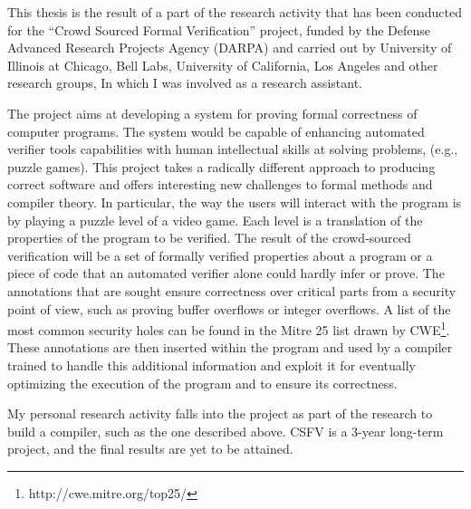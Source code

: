 
This thesis is the result of a part of the research activity that has been conducted for the ``Crowd Sourced Formal Verification'' project, funded by the Defense Advanced Research Projects Agency (DARPA) and carried out by University of Illinois at Chicago, Bell Labs, University of California, Los Angeles and other research groups, In which I was involved as a research assistant.

The project aims at developing a system for proving formal correctness of computer programs. The system would be capable of enhancing automated verifier tools capabilities with human intellectual skills at solving problems, (e.g., puzzle games). This project takes a radically different approach to producing correct software and offers interesting new challenges to formal methods and compiler theory. In particular, the way the users will interact with the program is by playing a puzzle level of a video game. Each level is a translation of the properties of the program to be verified. The result of the crowd-sourced verification will be a set of formally verified properties about a program or a piece of code that an automated verifier alone could hardly infer or prove. The annotations that are sought ensure correctness over critical parts from a security point of view, such as proving buffer overflows or integer overflows. A list of the most common security holes can be found in the Mitre 25 list drawn by CWE\footnote{http://cwe.mitre.org/top25/}. These annotations are then inserted within the program and used by a compiler trained to handle this additional information and exploit it for eventually optimizing the execution of the program and to ensure its correctness.

My personal research activity falls into the project as part of the research to build a compiler, such as the one described above. CSFV is a 3-year long-term project, and the final results are yet to be attained.
